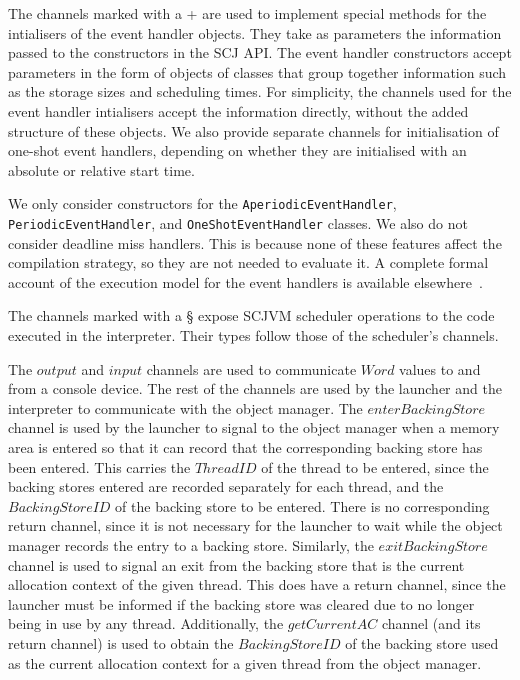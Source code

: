 The channels marked with a {}+{} are used to implement special methods
for the intialisers of the event handler objects.
They take as parameters the information passed to the constructors in
the SCJ API.
The event handler constructors accept parameters in the form of
objects of classes that group together information such as the storage
sizes and scheduling times.
For simplicity, the channels used for the event handler intialisers
accept the information directly, without the added structure of these
objects.
We also provide separate channels for initialisation of one-shot event
handlers, depending on whether they are initialised with an absolute
or relative start time.

We only consider constructors for the \texttt{AperiodicEventHandler},
\texttt{PeriodicEventHandler}, and
\texttt{OneShotEventHandler} classes.%
We also do not consider deadline miss handlers.
This is because none of these features affect the compilation
strategy, so they are not needed to evaluate it.
A complete formal account of the execution model for the event
handlers is available elsewhere~\cite{cavalcanti2013, luckcuck2016,
  zeyda2011}.

The channels marked with a \S{} expose SCJVM scheduler operations to
the code executed in the interpreter. 
Their types follow those of the scheduler's channels.

The $output$ and $input$ channels are used to communicate $Word$
values to and from a console device.
The rest of the channels are used by the launcher and the interpreter
to communicate with the object manager.
The $enterBackingStore$ channel is used by the launcher to signal to
the object manager when a memory area is entered so that it can record
that the corresponding backing store has been entered.
This carries the $ThreadID$ of the thread to be entered, since the
backing stores entered are recorded separately for each thread, and
the $BackingStoreID$ of the backing store to be entered.
There is no corresponding return channel, since it is not necessary
for the launcher to wait while the object manager records the entry to
a backing store.
Similarly, the $exitBackingStore$ channel is used to signal an exit
from the backing store that is the current allocation context of the
given thread.
This does have a return channel, since the launcher must be informed
if the backing store was cleared due to no longer being in use by any
thread.
Additionally, the $getCurrentAC$ channel (and its return channel) is
used to obtain the $BackingStoreID$ of the backing store used as the
current allocation context for a given thread from the object manager.

